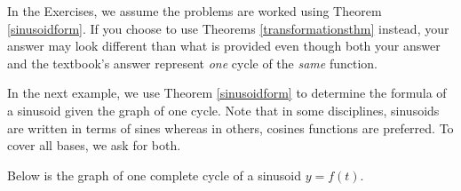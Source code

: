 \documentclass{ximera}
\begin{document}
 
 In the Exercises, we assume the problems are worked using Theorem \ref{sinusoidform}.  If you choose to use Theorems \ref{transformationsthm} instead, your answer may look different than what is provided even though both your answer and the textbook's answer represent \textit{one} cycle of the \textit{same} function.  


In the next example,  we use Theorem \ref{sinusoidform} to determine the formula of a sinusoid given the graph of one cycle.  Note that in some disciplines, sinusoids are written in terms of sines whereas in others,   cosines functions are preferred.  To cover all bases,  we ask for both.

\begin{example} \label{fitsinusoidtodata1} Below is the graph of one complete cycle of a sinusoid $y=f(t)$.

\begin{image}
\end{image}
\end{example}
\end{document}

